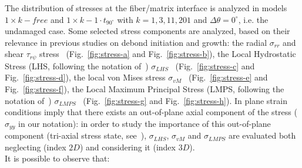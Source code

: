\documentclass[12pt,a4paper]{article}
\begin{document}
The distribution of stresses at the fiber/matrix interface is analyzed in models $1\times k-free$ and $1\times k-1\cdot t_{90^{\circ}}$ with $k=1,3,11,201$ and $\Delta\theta=0^{\circ}$, i.e. the undamaged case. Some selected stress components are analyzed, based on their relevance in previous studies on debond initiation and growth: the radial $\sigma_{rr}$ and shear $\tau_{r\psi}$ stress~\cite{Mantic2009} (Fig.~\ref{fig:stress-a} and Fig.~\ref{fig:stress-b}), the Local Hydrostatic Stress (LHS, following the notation of~\cite{Carraro2016}) $\sigma_{LHS}$~\cite{Asp1996a,Asp1996b} (Fig.~\ref{fig:stress-c} and Fig.~\ref{fig:stress-d}), the local von Mises stress $\sigma_{vM}$~\cite{Canal2012}  (Fig.~\ref{fig:stress-e} and Fig.~\ref{fig:stress-f}), the Local Maximum Principal Stress (LMPS, following the notation of~\cite{Carraro2016}) $\sigma_{LMPS}$~\cite{Carraro2014}  (Fig.~\ref{fig:stress-g} and Fig.~\ref{fig:stress-h}). In plane strain conditions imply that there exists an out-of-plane axial component of the stress ($\sigma_{yy}$ in our notation): in order to study the importance of this out-of-plane component (tri-axial stress state, see~\cite{Asp1995}), $\sigma_{LHS}$, $\sigma_{vM}$ and $\sigma_{LMPS}$ are evaluated both neglecting (index $2D$) and considering it (index $3D$).\\
It is possible to observe that:
\vspace{-5pt}
\end{document}
